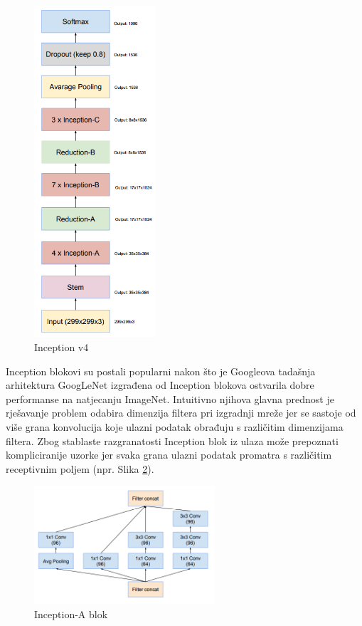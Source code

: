 \documentclass[times, utf8, proizvoljni, numeric]{fer}
\begin{document}
\begin{figure}[!ht]
	\begin{center}
		\captionsetup{justification=centering}
		\includegraphics[width=0.4\textwidth]{./imgs/inceptionv4.png}
		\caption{Inception v4 \cite{Inceptionv4}}
		\label{fg:inceptionv4}
	\end{center}
\end{figure}

Inception blokovi su postali popularni nakon što je Googleova tadašnja arhitektura GoogLeNet izgrađena od Inception blokova ostvarila dobre performanse na natjecanju ImageNet. Intuitivno njihova glavna prednost je rješavanje problem odabira dimenzija filtera pri izgradnji mreže jer se sastoje od više grana konvolucija koje ulazni podatak obrađuju s različitim dimenzijama filtera. Zbog stablaste razgranatosti Inception blok iz ulaza može prepoznati kompliciranije uzorke jer svaka grana ulazni podatak promatra s različitim receptivnim poljem (npr. Slika \ref{fg:inception_blok_a}).
	
\begin{figure}[!ht]
	\begin{center}
		\captionsetup{justification=centering}
		\includegraphics[width=0.6\textwidth]{./imgs/inception_blok_a.png}
		\caption{Inception-A blok  \cite{Inceptionv4}}
		\label{fg:inception_blok_a}
	\end{center}
\end{figure}
\end{document}
